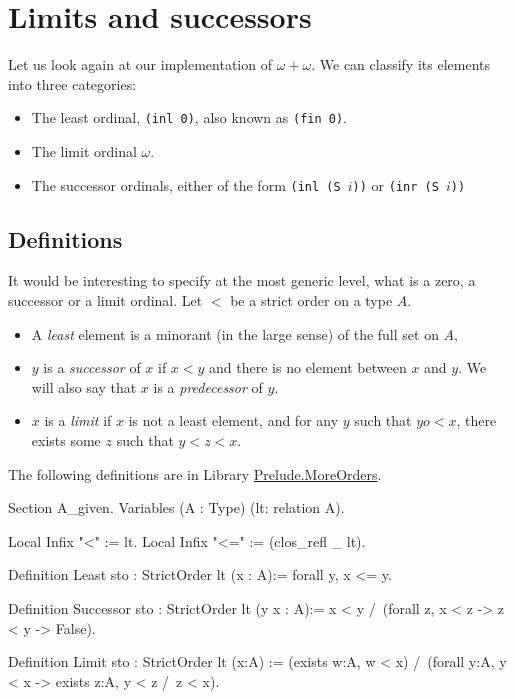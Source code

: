 %



\section{Limits and successors}

Let us look again at our implementation of $\omega+\omega$. We can classify its elements into three categories:

\begin{itemize}
\item The least ordinal, \texttt{(inl 0)}, also known as  \texttt{(fin 0)}.
\item The limit ordinal $\omega$.
\item The successor ordinals, either of the form \texttt{(inl (S $i$))} or \texttt{(inr (S $i$))}
\end{itemize}

\subsection{Definitions}
It would be interesting to specify at the most generic level, what is a zero, a successor or a limit ordinal. Let $<$ be a strict order on a type $A$.

\begin{itemize}
\item A \emph{least} element is a minorant (in the large sense) of the full set  on $A$,
\item $y$ is a \emph{successor} of $x$ if $x<y$ and there is no element between $x$ and $y$. We will also say that $x$ is a \emph{predecessor} of $y$.
\item $x$ is a \emph{limit} if $x$ is not a least element, and for any $y$ such that $yo<x$,
 there exists some $z$ such that $y<z<x$.
\end{itemize}


The following definitions are in Library \href{../theories/html/hydras.Prelude.MoreOrders.html}{Prelude.MoreOrders}.

\begin{Coqsrc}
Section A_given.
  Variables (A : Type)  (lt: relation A).
  
Local Infix "<" := lt.
Local Infix "<=" := (clos_refl _ lt).

Definition Least {sto : StrictOrder lt} (x : A):=
  forall y,  x <= y.

Definition Successor {sto : StrictOrder lt} (y x : A):=
  x < y /\ (forall z,  x < z ->  z <  y -> False).

Definition Limit {sto : StrictOrder lt}  (x:A)  :=
  (exists w:A,  w < x) /\
  (forall y:A, y < x -> exists z:A, y < z /\ z < x).
\end{Coqsrc}

